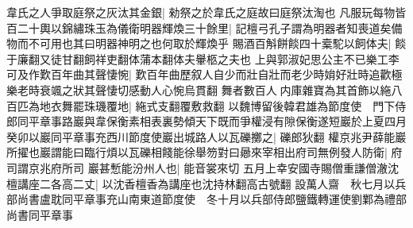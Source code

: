 韋氏之人爭取庭祭之灰汰其金銀|{
	勑祭之於韋氏之庭故曰庭祭汰淘也}
凡服玩每物皆百二十輿以錦繡珠玉為儀衛明器輝煥三十餘里|{
	記檀弓孔子謂為明器者知喪道矣備物而不可用也其曰明器神明之也何取於輝煥乎}
賜酒百斛餅餤四十槖駝以飼体夫|{
	餤于廉翻又徒甘翻飼祥吏翻体蒲本翻体夫轝柩之夫也}
上與郭淑妃思公主不已樂工李可及作歎百年曲其聲悽惋|{
	歎百年曲歷叙人自少而壯自壯而老少時姢好壯時追歡極樂老時衰颯之狀其聲悽切感動人心惋烏貫翻}
舞者數百人内庫雜寶為其首飾以絁八百匹為地衣舞罷珠璣覆地|{
	絁式支翻覆敷救翻}
以魏博留後韓君雄為節度使　門下侍郎同平章事路巖與韋保衡素相表裏勢傾天下既而爭權浸有隙保衡遂短巖於上夏四月癸卯以巖同平章事充西川節度使巖出城路人以瓦礫擲之|{
	礫郎狄翻}
權京兆尹薛能巖所擢也巖謂能曰臨行煩以瓦礫相餞能徐舉笏對曰曏來宰相出府司無例發人防衛|{
	府司謂京兆府所司}
巖甚慙能汾州人也|{
	能音裳來切}
五月上幸安國寺賜僧重謙僧澈沈檀講座二各高二丈|{
	以沈香檀香為講座也沈持林翻高古號翻}
設萬人齋　秋七月以兵部尚書盧耽同平章事充山南東道節度使　冬十月以兵部侍郎鹽鐵轉運使劉鄴為禮部尚書同平章事


